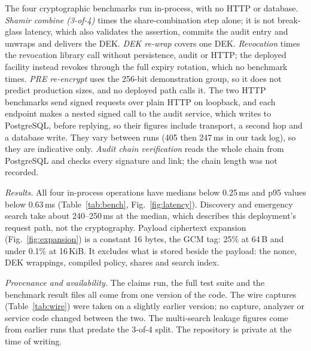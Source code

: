 The four cryptographic benchmarks run in-process, with no HTTP or
database. %
\emph{Shamir combine (3-of-4)} times the share-combination step alone; it is
not break-glass latency, which also validates the assertion, commits the
audit entry and unwraps and delivers the DEK. %
\emph{DEK re-wrap} covers one DEK. %
\emph{Revocation} times the revocation library call
without persistence, audit or HTTP; the deployed facility instead revokes
through the full expiry rotation, which no benchmark
times. %
\emph{PRE re-encrypt} uses the 256-bit demonstration group, so it does not
predict production sizes, and no deployed path calls it. %
The two HTTP benchmarks send signed requests over plain HTTP on loopback,
and each endpoint makes a nested signed call to the audit service, which
writes to PostgreSQL, before replying, so their figures include transport, a
second hop and a database write. %
They vary between runs (405 then 247\,ms in our task log), so they are
indicative only. %
\emph{Audit chain verification} reads the whole chain from PostgreSQL and
checks every signature and link; the chain length was not
recorded. %





\textit{Results.} All four in-process operations have medians below
0.25\,ms and p95 values below 0.63\,ms
(Table~\ref{tab:bench}, Fig.~\ref{fig:latency}). %
Discovery and emergency search take about 240--250\,ms at the median, which
describes this deployment's request path, not the cryptography. %
Payload ciphertext expansion (Fig.~\ref{fig:expansion}) is a constant
16 bytes, the GCM tag: 25\% at 64\,B and under 0.1\% at
16\,KiB. %
It excludes what is stored beside the payload: the nonce, DEK wrappings,
compiled policy, shares and search index. %

\textit{Provenance and availability.} The claims run, the full test suite
and the benchmark result files all come from one version of the code.
The wire captures (Table~\ref{tab:wire}) were taken on a slightly earlier
version; no capture, analyzer or service code changed between the two.
The multi-search leakage figures come from earlier runs that predate the
3-of-4 split. %
The repository is private at the time of writing. %
